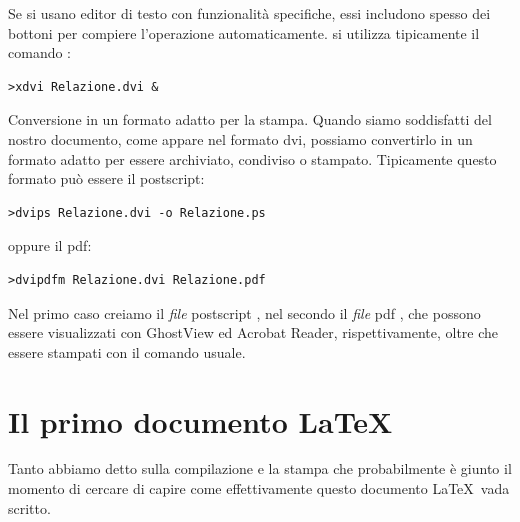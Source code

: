 \begin{numlist}
{{Se si usano editor di testo con funzionalit\`a specifiche, essi includono
spesso dei bottoni per compiere l'operazione automaticamente.
}
si utilizza tipicamente il comando :
\begin{verbatim}
>xdvi Relazione.dvi &
\end{verbatim}
}
\item{
Conversione in un formato adatto per la stampa. Quando siamo soddisfatti del
nostro documento, come appare nel formato dvi, possiamo convertirlo in un
formato adatto per essere archiviato, condiviso o stampato. Tipicamente questo
formato pu\`o essere il postscript:
\begin{verbatim}
>dvips Relazione.dvi -o Relazione.ps
\end{verbatim}
oppure il pdf:
\begin{verbatim}
>dvipdfm Relazione.dvi Relazione.pdf
\end{verbatim}
Nel primo caso creiamo il \emph{file} postscript , nel
secondo il \emph{file} pdf , che possono essere
visualizzati con GhostView ed Acrobat Reader, rispettivamente, oltre che
essere stampati con il comando usuale.
}
\end{numlist}


\section{Il primo documento \LaTeX}
\label{sec:Documento1}

Tanto abbiamo detto sulla compilazione e la stampa che probabilmente \`e
giunto il momento di cercare di capire come effettivamente questo documento
\LaTeX\ vada scritto.

